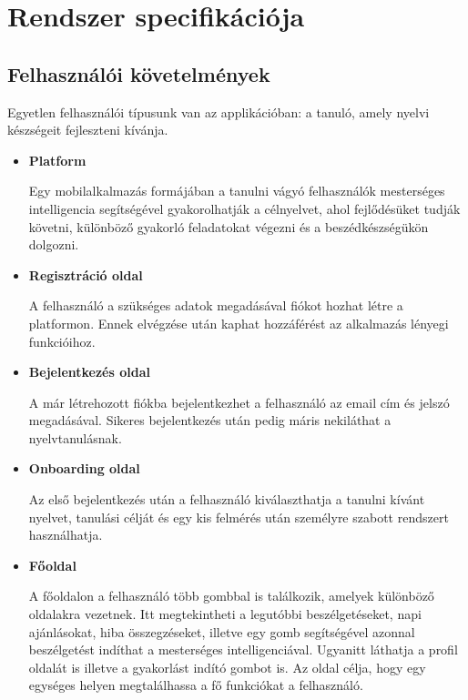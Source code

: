 \chapter{Rendszer specifikációja}

\section {Felhasználói követelmények}

Egyetlen felhasználói típusunk van az applikációban: a tanuló, amely nyelvi készségeit fejleszteni kívánja.

\begin{itemize}
    \item \textbf{Platform}
    
    Egy mobilalkalmazás formájában a tanulni vágyó felhasználók mesterséges intelligencia segítségével gyakorolhatják a célnyelvet, ahol fejlődésüket tudják követni, különböző gyakorló feladatokat végezni és a beszédkészségükön dolgozni.

    \item \textbf{Regisztráció oldal}

    A felhasználó a szükséges adatok megadásával fiókot hozhat létre a platformon. Ennek elvégzése után kaphat hozzáférést az alkalmazás lényegi funkcióihoz.

    \item \textbf{Bejelentkezés oldal}

    A már létrehozott fiókba bejelentkezhet a felhasználó az email cím és jelszó megadásával. Sikeres bejelentkezés után pedig máris nekiláthat a nyelvtanulásnak.

    \item \textbf{Onboarding oldal}

    Az első bejelentkezés után a felhasználó kiválaszthatja a tanulni kívánt nyelvet, tanulási célját és egy kis felmérés után személyre szabott rendszert használhatja.

    \item \textbf{Főoldal}

    A főoldalon a felhasználó több gombbal is találkozik, amelyek különböző oldalakra vezetnek. Itt megtekintheti a legutóbbi beszélgetéseket, napi ajánlásokat, hiba összegzéseket, illetve egy gomb segítségével azonnal beszélgetést indíthat a mesterséges intelligenciával. Ugyanitt láthatja a profil oldalát is illetve a gyakorlást indító gombot is. Az oldal célja, hogy egy egységes helyen megtalálhassa a fő funkciókat a felhasználó.


\end{itemize}
